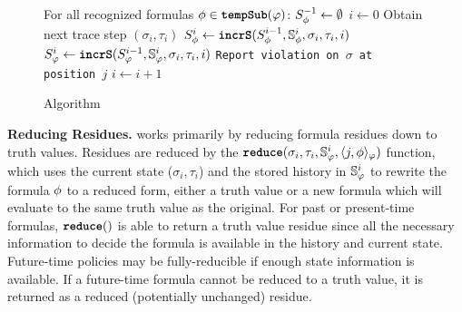 
\begin{figure}[t]
\begin{algorithmic}[1]
\STATE For all recognized formulas $\policyv \in \tempSub(\policy)$: $\histst[\policyv]{-1} \leftarrow \emptyset$
\STATE $i \leftarrow 0$
\LOOP
\STATE Obtain next trace step $(\sigma_i, \tau_i)$
	\STATE $\histst[\policyv]{i} \leftarrow \incrS(\histst[\policyv]{i-1}, \histSt[\policyv]{i}, \sigma_i, \tau_i, i)$
\ENDFOR
\STATE $\histst{i} \leftarrow \incrS(\histst{i-1}, \histSt{i}, \sigma_i, \tau_i, i)$
\STATE \texttt{Report violation on $\sigma$ at position $j$}
\ENDFOR
\STATE $i \leftarrow i + 1$
\ENDLOOP
\end{algorithmic}
\caption{\monitor Algorithm}\label{fig:algorithm}
\end{figure}

\textbf{Reducing Residues.}
\monitor works primarily by reducing formula residues down to truth values. Residues are reduced by the $\reduce(\sigma_i, \tau_i, \histSt{i}, \rpt{j}{\policyv}{\policy})$ function, which uses the current state ($\sigma_i,\tau_i$) and the stored history in $\histSt{i}$ to rewrite the formula $\policyv$ to a reduced form, either a truth value or a new formula which will evaluate to the same truth value as the original. For past or present-time formulas, $\reduce()$ is able to return a truth value residue since all the necessary information to decide the formula is available in the history and current state. Future-time policies may be fully-reducible if enough state information is available. If a future-time formula cannot be reduced to a truth value, it is returned as a reduced (potentially unchanged) residue.

